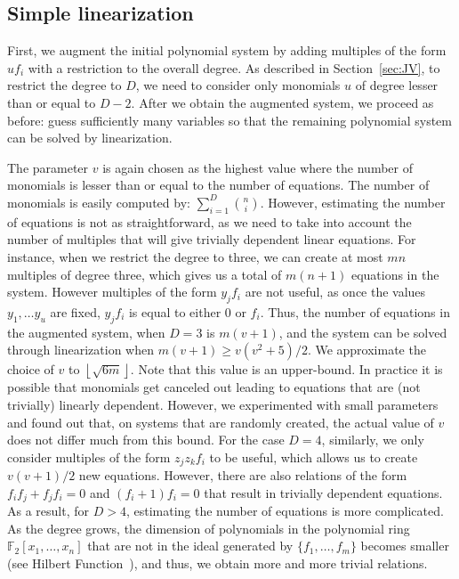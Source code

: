 \documentclass[a4paper,UKenglish,cleveref, autoref]{lipics-v2019}
\newcommand{\red}{\color{red}}
\newcommand{\TODO}[1]{{\red \textbf{TODO}:} #1\xspace}
\begin{document}
\subsection{Simple linearization}

First, we augment the initial polynomial system by adding multiples of the form $uf_i$ with a restriction to the overall degree. As described in Section~\ref{sec:JV}, to restrict the degree to $D$, we need to consider only monomials $u$ of degree lesser than or equal to $D-2$. After we obtain the augmented system, we proceed as before: guess sufficiently many variables so that the remaining polynomial system can be solved by linearization. 

The parameter $v$ is again chosen as the highest value where the number of monomials is lesser than or equal to the number of equations. The number of monomials is easily computed by: $\sum_{i=1}^{D}\binom{n}{i}$. However, estimating the number of equations is not as straightforward, as we need to take into account the number of multiples that will give trivially dependent linear equations. For instance, when we restrict the degree to three, we can create at most $mn$ multiples of degree three, which gives us a total of $m(n+1)$ equations in the system. However multiples of the form $y_jf_i$ are not useful, as once the values $y_1,\dots y_u$ are fixed, $y_jf_i$ is equal to either 0 or $f_i$. Thus, the number of equations in the augmented system, when $D=3$ is $m(v+1)$, and the system can be solved through linearization when $m(v+1) \geq v(v^2+5)/2$. We approximate the choice of $v$ to $\left\lfloor \sqrt{6m} \right\rfloor$.
Note that this value is an upper-bound. In practice it is possible that monomials get canceled out
leading to equations that are (not trivially) linearly dependent. However, we experimented with small
parameters and found out that, on systems that are randomly created, the actual value of $v$ does not
differ much from this bound. 
For the case $D=4$, similarly, we only consider multiples of the form 
$z_jz_kf_i$ to be useful, which allows us to create $v(v+1)/2$ new equations. 
However, there are also relations of the form $f_if_j + f_jf_i=0$ and $(f_i+1)f_i=0$ 
that result in trivially dependent equations. 
As a result, for $D > 4$, estimating the number of equations is more complicated. As the degree grows, the dimension of polynomials in the polynomial ring $\mathbb{F}_2[x_1, \dots, x_n]$ that are not in the ideal generated by $\{f_1, \dots, f_m\}$ becomes smaller (see Hilbert Function~\cite{Ideals_varieties_algos}), and thus, we obtain more and more trivial relations.
\end{document}
